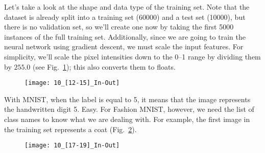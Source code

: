 Let's take a look at the shape and data type of the training set. Note that the dataset is already split into a training set (\num{60000}) and a test set (\num{10000}), but there is no validation set, so we'll create one now by taking the first \num{5000} instances of the full training set. Additionally, since we are going to train the neural network using gradient descent, we must scale the input features. For simplicity, we'll scale the pixel intensities down to the 0--1 range by dividing them by $255.0$ (see Fig.~\ref{10_[12-15]_In-Out}); this also converts them to floats.
\begin{figure}[h!t]
\centering
\texttt{[image: 10\_[12-15]\_In-Out]}
\caption{}\label{10_[12-15]_In-Out}
\end{figure}

With MNIST, when the label is equal to 5, it means that the image represents the handwritten digit 5. Easy. For Fashion MNIST, however, we need the list of class names to know what we are dealing with. For example, the first image in the training set represents a coat (Fig.~\ref{10_[17-19]_In-Out}).
\begin{figure}[h!t]
\centering
\texttt{[image: 10\_[17-19]\_In-Out]}
\caption{}\label{10_[17-19]_In-Out}
\end{figure}
